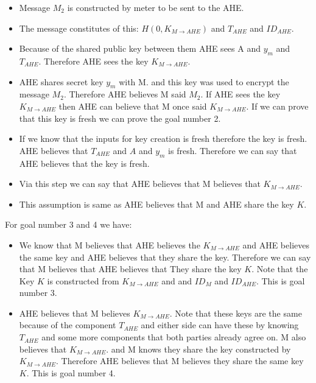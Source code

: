 \documentclass[a4paper, 11pt]{article}
\begin{document}
\begin{itemize}
    \item Message $M_2$ is constructed by meter to be sent to the AHE.
    \item The message constitutes of this: $H(0, K_{M \rightarrow AHE})$
        and $T_{AHE}$ and $ID_{AHE}$.
    \item Because of the shared public key between them AHE sees A and $y_m$
        and $T_{AHE}$. Therefore AHE sees the key $K_{M \rightarrow AHE}$.
    \item AHE shares secret key $y_m$ with M. and this key was used to encrypt
        the message $M_2$. Therefore AHE believes M said $M_2$. If AHE sees
        the key $K_{M \rightarrow AHE}$ then AHE can believe that M once said 
        $K_{M \rightarrow AHE}$. If we can prove that this key is fresh
        we can prove the goal number 2.
    \item If we know that the inputs for key creation is fresh therefore the
        key is fresh. AHE believes that $T_{AHE}$ and $A$ and $y_m$ is fresh.
        Therefore we can say that AHE believes that the key is fresh.
    \item Via this step we can say that AHE believes that M believes that
        $K_{M \rightarrow AHE}$.
    \item This assumption is same as AHE believes that M and AHE share the key
        $K$.
\end{itemize}
For goal number 3 and 4 we have:
\begin{itemize}
    \item We know that M believes that AHE believes the $K_{M \rightarrow AHE}$
        and AHE believes the same key and AHE believes that they share the key.
        Therefore we can say that M believes that AHE believes that They share the
        key $K$. Note that the Key $K$ is constructed from $K_{M \rightarrow AHE}$
        and and $ID_M$ and $ID_{AHE}$. This is goal number 3.
    \item AHE believes that M believes $K_{M \rightarrow AHE}$. Note that these
        keys are the same because of the component $T_{AHE}$ and either side
        can have these by knowing $T_{AHE}$ and some more components that both
        parties already agree on. M also believes that $K_{M \rightarrow AHE}$.
        and M knows they share the key constructed by $K_{M \rightarrow AHE}$.
        Therefore AHE believes that M believes they share the same key $K$. This
        is goal number 4.
\end{itemize}


\end{document}
